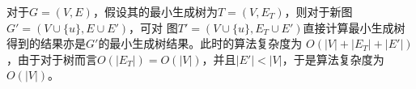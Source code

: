 \begin{solution}
    对于$G=(V,E)$，假设其的最小生成树为$T=(V,E_T)$，则对于新图$G'=(V\cup\{u\},E\cup E')$，可对
    图$T'=(V\cup\{u\},E_T\cup E')$直接计算最小生成树得到的结果亦是$G'$的最小生成树结果。此时的算法复杂度为
    $O(|V|+|E_T|+|E'|)$，由于对于树而言$O(|E_T|)=O(|V|)$，并且$|E'|<|V|$，于是算法复杂度为$O(|V|)$。
\end{solution}